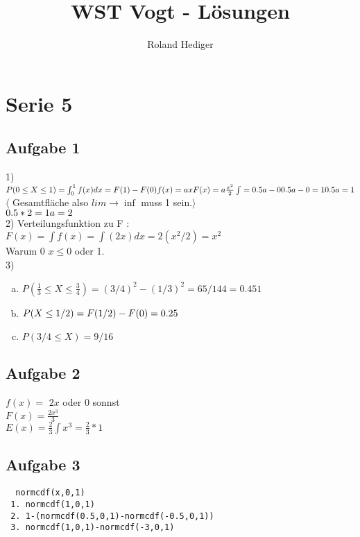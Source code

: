 \documentclass[a4paper,10pt]{scrbook}
\title{WST Vogt - Lösungen}
\author{Roland Hediger}
\begin{document}
\maketitle
\pagestyle{fancy}

\chapter*{Serie 5}
\section*{Aufgabe 1}
1) $P(0\leq X \leq 1) = \int_0^1 f(x)dx = F(1)-F(0)\\
f(x) = ax\\
F(x) = a \frac{x^2}{2} \\
\int = 0.5a - 0\\
0.5a -0 = 1 \\
0.5a = 1\\$ $\langle$ Gesamtfläche also $ lim \rightarrow \inf$ muss 1 sein.$\rangle$ \\
$0.5 * 2 = 1\\
a = 2$\\

2) Verteilungsfunktion zu F : \\
$F(x) = \int f(x) = \int (2x) dx = 2(x^2/2) = x^2 $\\
Warum 0 $ x \le 0$  oder 1.\\
3) \begin{enumerate}[a)]
    \item $P(\frac{1}{3} \le X \le \frac{3}{4}) = (3/4)^2 - (1/3)^2 = 65/144 = 0.451$
    \item $P(X \le 1/2) = F(1/2) - F(0) = 0.25\\$
    \item $P(3/4 \le X) = 9/16$ \\ 
   \end{enumerate}

   \section*{Aufgabe 2}
   $f(x) =$ $2x$ oder 0 sonnst \\
   $ F(x) = \frac{2x^3}{3}$ \\
   $E(x) = \frac{2}{3} \int x^3 = \frac{2}{3}*1$
     
\section*{Aufgabe 3}
\begin{verbatim}
  normcdf(x,0,1) 
 1. normcdf(1,0,1)
 2. 1-(normcdf(0.5,0,1)-normcdf(-0.5,0,1))
 3. normcdf(1,0,1)-normcdf(-3,0,1)
\end{verbatim}
\end{document}
